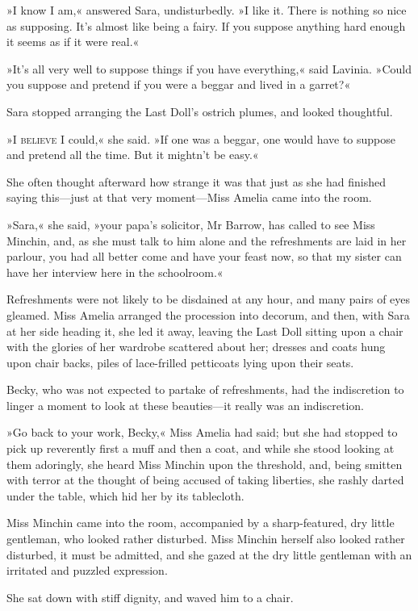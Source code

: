 »I know I am,« answered Sara, undisturbedly. »I like it. There is nothing so nice as supposing. It's almost like being a fairy. If you suppose anything hard enough it seems as if it were real.«

»It's all very well to suppose things if you have everything,« said Lavinia. »Could you suppose and pretend if you were a beggar and lived in a garret?«

Sara stopped arranging the Last Doll's ostrich plumes, and looked thoughtful.

»I \textsc{believe} I could,« she said. »If one was a beggar, one would have to suppose and pretend all the time. But it mightn't be easy.«

She often thought afterward how strange it was that just as she had finished saying this—just at that very moment—Miss Amelia came into the room.

»Sara,« she said, »your papa's solicitor, Mr Barrow, has called to see Miss Minchin, and, as she must talk to him alone and the refreshments are laid in her parlour, you had all better come and have your feast now, so that my sister can have her interview here in the schoolroom.«

Refreshments were not likely to be disdained at any hour, and many pairs of eyes gleamed. Miss Amelia arranged the procession into decorum, and then, with Sara at her side heading it, she led it away, leaving the Last Doll sitting upon a chair with the glories of her wardrobe scattered about her; dresses and coats hung upon chair backs, piles of lace-frilled petticoats lying upon their seats.

Becky, who was not expected to partake of refreshments, had the indiscretion to linger a moment to look at these beauties—it really was an indiscretion.

»Go back to your work, Becky,« Miss Amelia had said; but she had stopped to pick up reverently first a muff and then a coat, and while she stood looking at them adoringly, she heard Miss Minchin upon the threshold, and, being smitten with terror at the thought of being accused of taking liberties, she rashly darted under the table, which hid her by its tablecloth.

Miss Minchin came into the room, accompanied by a sharp-featured, dry little gentleman, who looked rather disturbed. Miss Minchin herself also looked rather disturbed, it must be admitted, and she gazed at the dry little gentleman with an irritated and puzzled expression.

She sat down with stiff dignity, and waved him to a chair.

